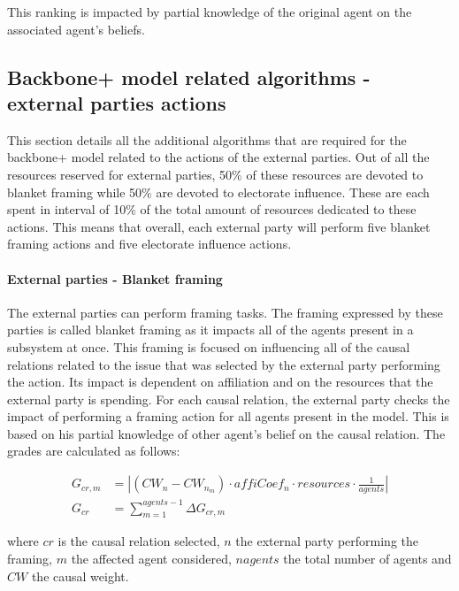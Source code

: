 This ranking is impacted by partial knowledge of the original agent on the associated agent's beliefs.

\subsection{Backbone+ model related algorithms - external parties actions}

This section details all the additional algorithms that are required for the backbone+ model related to the actions of the external parties. Out of all the resources reserved for external parties, 50\% of these resources are devoted to blanket framing while 50\% are devoted to electorate influence. These are each spent in interval of 10\% of the total amount of resources dedicated to these actions. This means that overall, each external party will perform five blanket framing actions and five electorate influence actions.

\paragraph{External parties - Blanket framing}

The external parties can perform framing tasks. The framing expressed by these parties is called blanket framing as it impacts all of the agents present in a subsystem at once. This framing is focused on influencing all of the causal relations related to the issue that was selected by the external party performing the action. Its impact is dependent on affiliation and on the resources that the external party is spending. For each causal relation, the external party checks the impact of performing a framing action for all agents present in the model. This is based on his partial knowledge of other agent's belief on the causal relation. The grades are calculated as follows:

\begin{equation}\begin{split}
G_{cr,m} &= \left| \left(CW_{n} - CW_{n_m} \right) \cdot affiCoef_n \cdot resources \cdot \frac{1}{agents} \right| \\
G_{cr} &= \sum_{m = 1}^{agents-1} \Delta G_{cr, m}
\end{split}\end{equation}

where $cr$ is the causal relation selected, $n$ the external party performing the framing, $m$ the affected agent considered, $nagents$ the total number of agents and $CW$ the causal weight.

